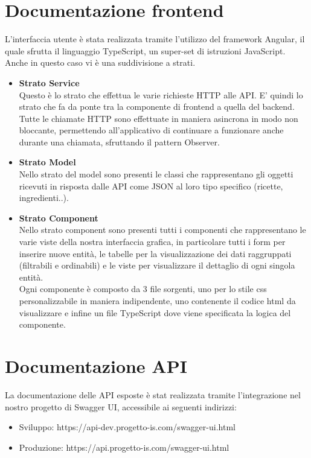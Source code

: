 \documentclass{article}
\begin{document}
\section{Documentazione frontend}
L’interfaccia utente è stata realizzata tramite l’utilizzo del framework Angular, il quale sfrutta il linguaggio TypeScript, un super-set di istruzioni JavaScript. Anche in questo caso vi è una suddivisione a strati.
\begin{itemize}
    \item \textbf{Strato Service}\\
Questo è lo strato che effettua le varie richieste HTTP alle API. E' quindi lo strato che fa da ponte tra la componente di frontend a quella del backend.\\
Tutte le chiamate HTTP sono effettuate in maniera asincrona in modo non bloccante, permettendo all’applicativo di continuare a funzionare anche durante una chiamata, sfruttando il pattern Observer.
\item \textbf{Strato Model}\\
Nello strato del model sono presenti le classi che rappresentano gli oggetti ricevuti in risposta dalle API come JSON al loro tipo specifico (ricette, ingredienti..).
\item \textbf{Strato Component}\\
Nello strato component sono presenti tutti i componenti che rappresentano le varie viste della nostra interfaccia grafica, in particolare tutti i form per inserire nuove entità, le tabelle per la visualizzazione dei dati raggruppati (filtrabili e ordinabili) e le viste per visualizzare il dettaglio di ogni singola entità.\\
Ogni componente è composto da 3 file sorgenti, uno per lo stile css personalizzabile in maniera indipendente, uno contenente il codice html da visualizzare e infine un file TypeScript dove viene specificata la logica del componente.
\end{itemize}
\section{Documentazione API}
La documentazione delle API esposte è stat realizzata tramite l’integrazione nel nostro progetto di Swagger UI, accessibile ai seguenti indirizzi:
\begin{itemize}
    \item Sviluppo: https://api-dev.progetto-is.com/swagger-ui.html
    \item Produzione: https://api.progetto-is.com/swagger-ui.html
\end{itemize}
\clearpage
\end{document}
